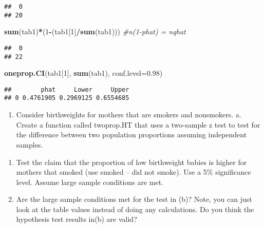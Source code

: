 \documentclass[
]{article}
\newenvironment{Shaded}{\begin{snugshade}}{\end{snugshade}}
\newcommand{\CommentTok}[1]{\textcolor[rgb]{0.56,0.35,0.01}{\textit{#1}}}
\newcommand{\DataTypeTok}[1]{\textcolor[rgb]{0.13,0.29,0.53}{#1}}
\newcommand{\DecValTok}[1]{\textcolor[rgb]{0.00,0.00,0.81}{#1}}
\newcommand{\FloatTok}[1]{\textcolor[rgb]{0.00,0.00,0.81}{#1}}
\newcommand{\KeywordTok}[1]{\textcolor[rgb]{0.13,0.29,0.53}{\textbf{#1}}}
\newcommand{\NormalTok}[1]{#1}
\newcommand{\OperatorTok}[1]{\textcolor[rgb]{0.81,0.36,0.00}{\textbf{#1}}}
\newcommand{\StringTok}[1]{\textcolor[rgb]{0.31,0.60,0.02}{#1}}
\providecommand{\tightlist}{%
  \setlength{\itemsep}{0pt}\setlength{\parskip}{0pt}}
\begin{document}
\begin{Shaded}
\end{Shaded}

\begin{verbatim}
##  0 
## 20
\end{verbatim}

\begin{Shaded}
\begin{Highlighting}[]
\KeywordTok{sum}\NormalTok{(tab1)}\OperatorTok{*}\NormalTok{(}\DecValTok{1}\OperatorTok{-}\NormalTok{(tab1[}\DecValTok{1}\NormalTok{]}\OperatorTok{/}\KeywordTok{sum}\NormalTok{(tab1))) }\CommentTok{#n(1-phat) = nqhat}
\end{Highlighting}
\end{Shaded}

\begin{verbatim}
##  0 
## 22
\end{verbatim}

\begin{Shaded}
\begin{Highlighting}[]
\KeywordTok{oneprop.CI}\NormalTok{(tab1[}\DecValTok{1}\NormalTok{], }\KeywordTok{sum}\NormalTok{(tab1), }\DataTypeTok{conf.level=}\FloatTok{0.98}\NormalTok{)}
\end{Highlighting}
\end{Shaded}

\begin{verbatim}
##        phat     Lower     Upper
## 0 0.4761905 0.2969125 0.6554685
\end{verbatim}

\begin{enumerate}
\def\labelenumi{\arabic{enumi}.}
\setcounter{enumi}{3}
\tightlist
\item
  Consider birthweights for mothers that are smokers and nonsmokers. a.
  Create a function called twoprop.HT that uses a two-sample z test to
  test for the difference between two population proportions assuming
  independent samples.
\end{enumerate}

\begin{enumerate}
\def\labelenumi{\alph{enumi}.}
\setcounter{enumi}{1}
\item
  Test the claim that the proportion of low birthweight babies is higher
  for mothers that smoked (use smoked -- did not smoke). Use a 5\%
  significance level. Assume large sample conditions are met.
\item
  Are the large sample conditions met for the test in (b)? Note, you can
  just look at the table values instead of doing any calculations. Do
  you think the hypothesis test results in(b) are valid?
\end{enumerate}
\end{document}
